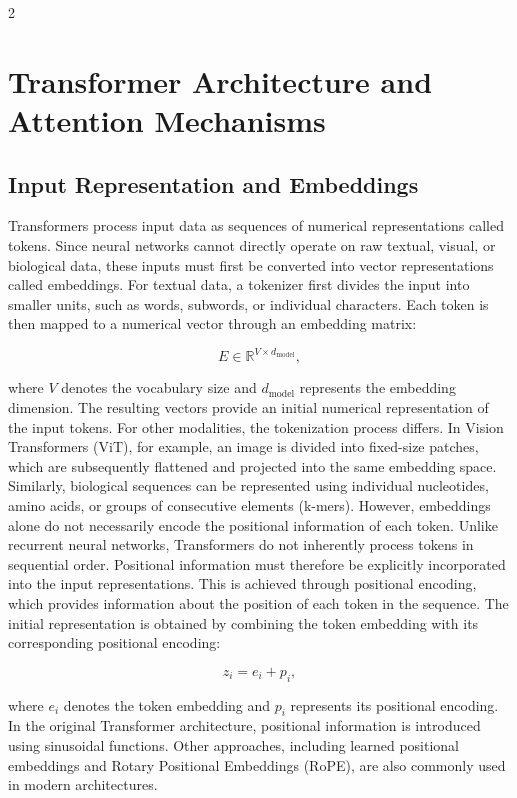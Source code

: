 \documentclass[10pt]{article}
\begin{document}
\begin{multicols}{2}
\section{Transformer Architecture and Attention Mechanisms}
\subsection{Input Representation and Embeddings}
Transformers process input data as sequences of numerical representations called tokens. 
Since neural networks cannot directly operate on raw textual, visual, 
or biological data, these inputs must first be converted into vector representations called embeddings.
For textual data, a tokenizer first divides the input into smaller units, 
such as words, subwords, or individual characters. 
Each token is then mapped to a numerical vector through an embedding matrix:

\begin{equation}
E \in \mathbb{R}^{V \times d_{\text{model}}},
\end{equation}

where \(V\) denotes the vocabulary size and \(d_{\text{model}}\) represents the embedding dimension. 
The resulting vectors provide an initial numerical representation of the input tokens.
For other modalities, 
the tokenization process differs. In Vision Transformers (ViT), 
for example, an image is divided into fixed-size patches, 
which are subsequently flattened and projected into the same embedding space. 
Similarly, biological sequences can be represented using individual nucleotides, 
amino acids, or groups of consecutive elements (k-mers).
However, embeddings alone do not necessarily encode the positional information of each token. 
Unlike recurrent neural networks, Transformers do not inherently process tokens in sequential order. 
Positional information must therefore be explicitly incorporated into the input representations.
This is achieved through positional encoding, 
which provides information about the position of each token in the sequence. 
The initial representation is obtained by combining the token embedding with its corresponding positional encoding:

\begin{equation}
z_i = e_i + p_i,
\end{equation}

where \(e_i\) denotes the token embedding and \(p_i\) represents its positional encoding.
In the original Transformer architecture, positional information is introduced using sinusoidal functions. 
Other approaches, including learned positional embeddings and Rotary Positional Embeddings (RoPE), 
are also commonly used in modern architectures.


\end{multicols}
\end{document}
